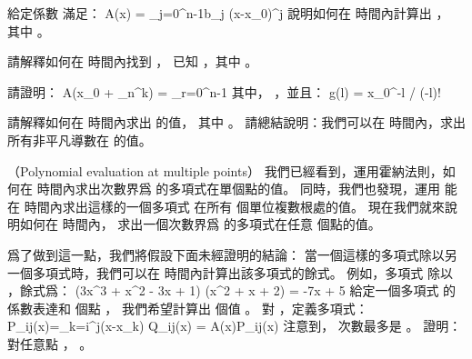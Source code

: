 \startigBase[a]\startitem
給定係數  滿足：
\startformula
A(x) = \sum_{j=0}^{n-1}b_j (x-x_0)^j
\stopformula
說明如何在  時間內計算出 ，
其中 。
\stopitem\stopigBase

\startANSWER
{}
\stopANSWER

\startigBase[continue]\startitem
請解釋如何在  時間內找到 ，
已知 ，其中 。
\stopitem\stopigBase

\startANSWER
{}
\stopANSWER

\startigBase[continue]\startitem
請證明：
\startformula
A(x_0 + \omega_n^k) = \sum_{r=0}^{n-1}\left[
	\frac{\omega_n^{kr}}{r!}
	\sum_{j=0}^{n-1}f(j)g(r-j)
\right]
\stopformula
其中， ，並且：
\startformula
g(l) = \startcases
\NC x_0^{-l} / (-l)! \NC {} \NR
{} \NC {} \NR
\stopcases
\stopformula
\stopitem\stopigBase

\startANSWER
{}
\stopANSWER

\startigBase[continue]\startitem
請解釋如何在  時間內求出  的值，
其中 。
請總結說明：我們可以在  時間內，求出  所有非平凡導數在  的值。
\stopitem\stopigBase

\startANSWER
{}
\stopANSWER
\stopPROBLEM

\startPROBLEM
（Polynomial evaluation at multiple points）
我們已經看到，運用霍納法則，如何在  時間內求出次數界爲  的多項式在單個點的值。
同時，我們也發現，運用  能在  時間內求出這樣的一個多項式
在所有  個單位複數根處的值。
現在我們就來說明如何在  時間內，
求出一個次數界爲  的多項式在任意  個點的值。

爲了做到這一點，我們將假設下面未經證明的結論：
當一個這樣的多項式除以另一個多項式時，我們可以在  時間內計算出該多項式的餘式。
例如，多項式  除以 ，餘式爲：
\startformula
(3x^3 + x^2 - 3x + 1) \mod (x^2 + x + 2) = -7x + 5
\stopformula
給定一個多項式  的係數表達和
  個點 ，
我們希望計算出  個值 。
對 ，定義多項式：
\startformula
P_{ij}(x)=\Pi_{k=i}^{j}(x-x_k)
\stopformula
\startformula
Q_{ij}(x) = A(x)\mod P_{ij}(x)
\stopformula
注意到，  次數最多是 。
\startigBase[a]\startitem
證明：對任意點 ， 。
\stopitem\stopigBase

